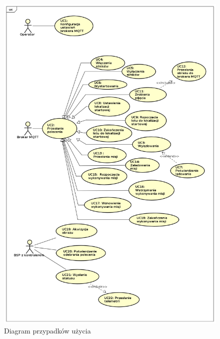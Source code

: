 \newpage

\begin{figure}[!ht]
\begin{center}
\includegraphics[width=14cm]{./Obrazy/UseCaseDiagram0.png}
\caption{Diagram przypadków użycia}
\end{center}
\end{figure}
  


